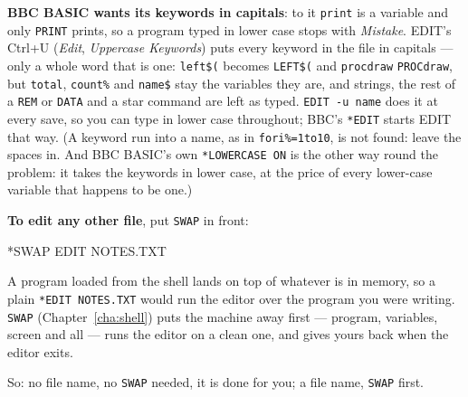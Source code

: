 \textbf{BBC BASIC wants its keywords in capitals}: to it \verb|print| is a
variable and only \verb|PRINT| prints, so a program typed in lower case
stops with \emph{Mistake}. EDIT's Ctrl+U (\emph{Edit}, \emph{Uppercase
Keywords}) puts every keyword in the file in capitals --- only a whole word
that is one: \verb|left$(| becomes \verb|LEFT$(| and \verb|procdraw|
\verb|PROCdraw|, but \verb|total|, \verb|count%| and \verb|name$| stay
the variables they are, and strings, the rest of a \verb|REM| or
\verb|DATA| and a star command are left as typed. \verb|EDIT -u name|
does it at every save, so you can type in lower case throughout; BBC's
\verb|*EDIT| starts EDIT that way. (A keyword run into a name, as in
\verb|fori%=1to10|, is not found: leave the spaces in. And BBC BASIC's own
\verb|*LOWERCASE ON| is the other way round the problem: it takes the
keywords in lower case, at the price of every lower-case variable that
happens to be one.)

\textbf{To edit any other file}, put \verb|SWAP| in front:

\begin{type}
*SWAP EDIT NOTES.TXT
\end{type}

\noindent A program loaded from the shell lands on top of whatever is in
memory, so a plain \verb|*EDIT NOTES.TXT| would run the editor over the
program you were writing. \verb|SWAP| (Chapter~\ref{cha:shell}) puts the
machine away first --- program, variables, screen and all --- runs the
editor on a clean one, and gives yours back when the editor exits.

So: no file name, no \verb|SWAP| needed, it is done for you; a file name,
\verb|SWAP| first.
